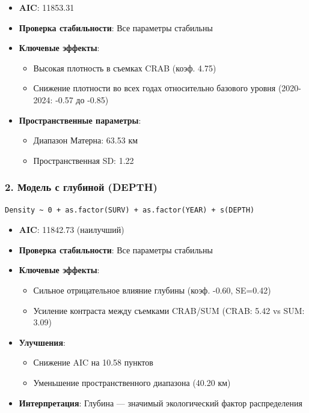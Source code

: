 \documentclass[
  letterpaper,
  DIV=11,
  numbers=noendperiod]{scrreprt}
\begin{document}
\begin{itemize}
\item
  \textbf{AIC}: 11853.31
\item
  \textbf{Проверка стабильности}: Все параметры стабильны
\item
  \textbf{Ключевые эффекты}:

  \begin{itemize}
  \item
    Высокая плотность в съемках CRAB (коэф. 4.75)
  \item
    Снижение плотности во всех годах относительно базового уровня
    (2020-2024: -0.57 до -0.85)
  \end{itemize}
\item
  \textbf{Пространственные параметры}:

  \begin{itemize}
  \item
    Диапазон Матерна: 63.53 км
  \item
    Пространственная SD: 1.22
  \end{itemize}
\end{itemize}

\subsubsection{\texorpdfstring{\textbf{2. Модель с глубиной
(DEPTH)}}{2. Модель с глубиной (DEPTH)}}\label{ux43cux43eux434ux435ux43bux44c-ux441-ux433ux43bux443ux431ux438ux43dux43eux439-depth}

\begin{verbatim}
Density ~ 0 + as.factor(SURV) + as.factor(YEAR) + s(DEPTH)
\end{verbatim}

\begin{itemize}
\item
  \textbf{AIC}: 11842.73 (наилучший)
\item
  \textbf{Проверка стабильности}: Все параметры стабильны
\item
  \textbf{Ключевые эффекты}:

  \begin{itemize}
  \item
    Сильное отрицательное влияние глубины (коэф. -0.60, SE=0.42)
  \item
    Усиление контраста между съемками CRAB/SUM (CRAB: 5.42 vs SUM: 3.09)
  \end{itemize}
\item
  \textbf{Улучшения}:

  \begin{itemize}
  \item
    Снижение AIC на 10.58 пунктов
  \item
    Уменьшение пространственного диапазона (40.20 км)
  \end{itemize}
\item
  \textbf{Интерпретация}: Глубина --- значимый экологический фактор
  распределения
\end{itemize}
\end{document}
